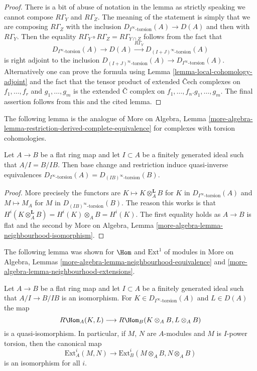 \begin{proof}
There is a bit of abuse of notation in the lemma as strictly
speaking we cannot compose $R\Gamma_Y$ and $R\Gamma_Z$. The
meaning of the statement is simply that we are composing
$R\Gamma_Z$ with the inclusion $D_{I^\infty\text{-torsion}}(A) \to D(A)$
and then with $R\Gamma_Y$. Then the equality
$R\Gamma_Y \circ R\Gamma_Z = R\Gamma_{Y \cap Z}$
follows from the fact that
$$
D_{I^\infty\text{-torsion}}(A) \to D(A) \xrightarrow{R\Gamma_Y}
D_{(I + J)^\infty\text{-torsion}}(A)
$$
is right adjoint to the inclusion
$D_{(I + J)^\infty\text{-torsion}}(A) \to D_{I^\infty\text{-torsion}}(A)$.
Alternatively one can prove the formula using
Lemma \ref{lemma-local-cohomology-adjoint}
and the fact that the tensor product of
extended {\v C}ech complexes on $f_1, \ldots, f_r$ and
$g_1, \ldots, g_m$ is the extended {\v C} complex on
$f_1, \ldots, f_n. g_1, \ldots, g_m$.
The final assertion follows from this and the cited lemma.
\end{proof}

\noindent
The following lemma is the analogue of
More on Algebra, Lemma
\ref{more-algebra-lemma-restriction-derived-complete-equivalence}
for complexes with torsion cohomologies.

\begin{lemma}
\label{lemma-torsion-flat-change-rings}
Let $A \to B$ be a flat ring map and let $I \subset A$ be a finitely
generated ideal such that $A/I = B/IB$. Then base change and
restriction induce quasi-inverse equivalences
$D_{I^\infty\text{-torsion}}(A) = D_{(IB)^\infty\text{-torsion}}(B)$.
\end{lemma}

\begin{proof}
More precisely the functors are $K \mapsto K \otimes_A^\mathbf{L} B$
for $K$ in $D_{I^\infty\text{-torsion}}(A)$ and $M \mapsto M_A$
for $M$ in $D_{(IB)^\infty\text{-torsion}}(B)$. The reason this works
is that $H^i(K \otimes_A^\mathbf{L} B) = H^i(K) \otimes_A B = H^i(K)$.
The first equality holds as $A \to B$ is flat and the second by
More on Algebra, Lemma \ref{more-algebra-lemma-neighbourhood-isomorphism}.
\end{proof}

\noindent
The following lemma was shown for $\Hom$ and $\text{Ext}^1$ of modules in
More on Algebra, Lemmas \ref{more-algebra-lemma-neighbourhood-equivalence} and
\ref{more-algebra-lemma-neighbourhood-extensions}.

\begin{lemma}
\label{lemma-neighbourhood-extensions}
Let $A \to B$ be a flat ring map and let $I \subset A$ be a
finitely generated ideal such that $A/I \to B/IB$ is an isomorphism.
For $K \in D_{I^\infty\text{-torsion}}(A)$ and $L \in D(A)$
the map
$$
R\Hom_A(K, L) \longrightarrow R\Hom_B(K \otimes_A B, L \otimes_A B)
$$
is a quasi-isomorphism. In particular, if $M$, $N$ are $A$-modules and
$M$ is $I$-power torsion, then the canonical map
$$
\text{Ext}^i_A(M, N)
\longrightarrow
\text{Ext}^i_B(M \otimes_A B, N \otimes_A B)
$$
is an isomorphism for all $i$. 
\end{lemma}

